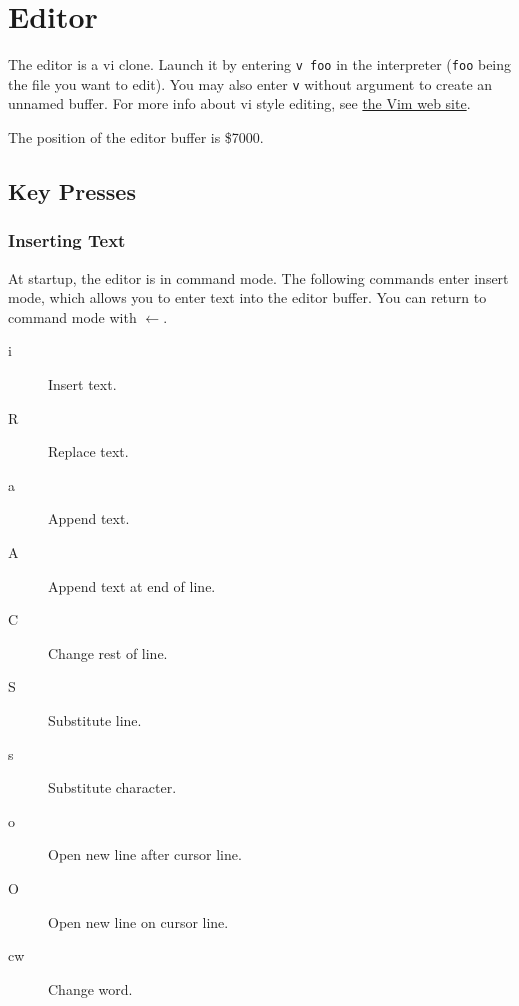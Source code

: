 \chapter{Editor} \label{editor}

The editor is a vi clone. Launch it by entering \texttt{v foo} in the interpreter (\texttt{foo} being the file you want to edit). You may also enter \texttt{v} without argument to create an unnamed buffer. For more info about vi style editing, see \href{http://www.vim.org}{the Vim web site}.

The position of the editor buffer is \$7000.

\section{Key Presses}

\subsection{Inserting Text}
At startup, the editor is in command mode. The following commands enter insert mode, which allows you to enter text into the editor buffer. You can return to command mode with $\leftarrow$.
\begin{description}
\item[i] Insert text.
\item[R] Replace text.
\item[a] Append text.
\item[A] Append text at end of line.
\item[C] Change rest of line.
\item[S] Substitute line.
\item[s] Substitute character.
\item[o] Open new line after cursor line.
\item[O] Open new line on cursor line.
\item[cw] Change word.
\end{description}


